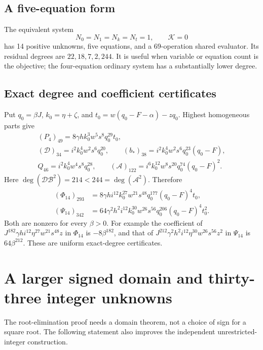 \documentclass[11pt,a4paper]{article}
\theoremstyle{remark}\newtheorem{remark}[theorem]{Remark}
\begin{document}
\subsection{A five-equation form}

The equivalent system
\[
 N_0=N_1=N_k=N_t=1,\qquad \mathcal K=0
\]
has 14 positive unknowns, five equations, and a 69-operation shared
evaluator. Its residual degrees are \(22,18,7,2,244\). It is useful when
variable or equation count is the objective; the four-equation ordinary
system has a substantially lower degree.

\subsection{Exact degree and coefficient certificates}

Put \(q_0=\beta J\), \(k_0=\eta+\zeta\), and
\(t_0=w(q_0-F-\alpha)-zq_0\). Highest homogeneous parts give
\begin{gather*}
 (P_4)_{49}=8\gamma h k_0^3w^5s^8q_0^{29}t_0,\\
 (\mathcal D)_{34}=i^2k_0^4w^2s^6q_0^{20},\qquad
 (b_*)_{38}=i^2k_0^4w^2s^6q_0^{23}(q_0-F),\\
 Q_{46}=i^2k_0^4w^4s^8q_0^{28},\qquad
 (\mathcal A)_{122}=i^6k_0^{12}w^8s^{20}q_0^{74}(q_0-F)^2.
\end{gather*}
Here \(\deg(\mathcal D\mathcal B^2)=214<244=\deg(\mathcal A^2)\).
Therefore
\begin{align*}
 (\Phi_{14})_{293}
  &=8\gamma h i^{12}k_0^{27}w^{21}s^{48}q_0^{177}(q_0-F)^4t_0,\\
 (\Psi_{14})_{342}
  &=64\gamma^2h^2i^{12}k_0^{30}w^{26}s^{56}
         q_0^{206}(q_0-F)^4t_0^2.
\end{align*}
Both are nonzero for every \(\beta>0\). For example the coefficient of
\(J^{182}\gamma h i^{12}\eta^{27}w^{21}s^{48}z\) in \(\Phi_{14}\)
is \(-8\beta^{182}\), and that of
\(J^{212}\gamma^2h^2i^{12}\eta^{30}w^{26}s^{56}z^2\) in \(\Psi_{14}\)
is \(64\beta^{212}\). These are uniform exact-degree certificates.

\section{A larger signed domain and thirty-three integer unknowns}\label{sec:signed}

The root-elimination proof needs a domain theorem, not a choice of sign
for a square root. The following statement also improves the independent
unrestricted-integer construction.
\end{document}
